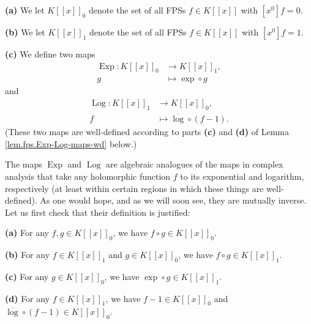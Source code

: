 \begin{definition}
\label{def.fps.Exp-Log-maps}\textbf{(a)} We let $K\left[  \left[  x\right]
\right]  _{0}$ denote the set of all FPSs $f\in K\left[  \left[  x\right]
\right]  $ with $\left[  x^{0}\right]  f=0$. \medskip

\textbf{(b)} We let $K\left[  \left[  x\right]  \right]  _{1}$ denote the set
of all FPSs $f\in K\left[  \left[  x\right]  \right]  $ with $\left[
x^{0}\right]  f=1$. \medskip

\textbf{(c)} We define two maps%
\begin{align*}
\operatorname*{Exp}:K\left[  \left[  x\right]  \right]  _{0}  &  \rightarrow
K\left[  \left[  x\right]  \right]  _{1},\\
g  &  \mapsto\exp\circ g
\end{align*}
and%
\begin{align*}
\operatorname*{Log}:K\left[  \left[  x\right]  \right]  _{1}  &  \rightarrow
K\left[  \left[  x\right]  \right]  _{0},\\
f  &  \mapsto\overline{\log}\circ\left(  f-1\right)  .
\end{align*}
(These two maps are well-defined according to parts \textbf{(c)} and
\textbf{(d)} of Lemma \ref{lem.fps.Exp-Log-maps-wd} below.)
\end{definition}

The maps $\operatorname*{Exp}$ and $\operatorname*{Log}$ are algebraic
analogues of the maps in complex analysis that take any holomorphic function
$f$ to its exponential and logarithm, respectively (at least within certain
regions in which these things are well-defined). As one would hope, and as we
will soon see, they are mutually inverse. Let us first check that their
definition is justified:

\begin{lemma}
\label{lem.fps.Exp-Log-maps-wd}\textbf{(a)} For any $f,g\in K\left[  \left[
x\right]  \right]  _{0}$, we have $f\circ g\in K\left[  \left[  x\right]
\right]  _{0}$. \medskip

\textbf{(b)} For any $f\in K\left[  \left[  x\right]  \right]  _{1}$ and $g\in
K\left[  \left[  x\right]  \right]  _{0}$, we have $f\circ g\in K\left[
\left[  x\right]  \right]  _{1}$. \medskip

\textbf{(c)} For any $g\in K\left[  \left[  x\right]  \right]  _{0}$, we have
$\exp\circ g\in K\left[  \left[  x\right]  \right]  _{1}$. \medskip

\textbf{(d)} For any $f\in K\left[  \left[  x\right]  \right]  _{1}$, we have
$f-1\in K\left[  \left[  x\right]  \right]  _{0}$ and $\overline{\log}%
\circ\left(  f-1\right)  \in K\left[  \left[  x\right]  \right]  _{0}$.
\end{lemma}

